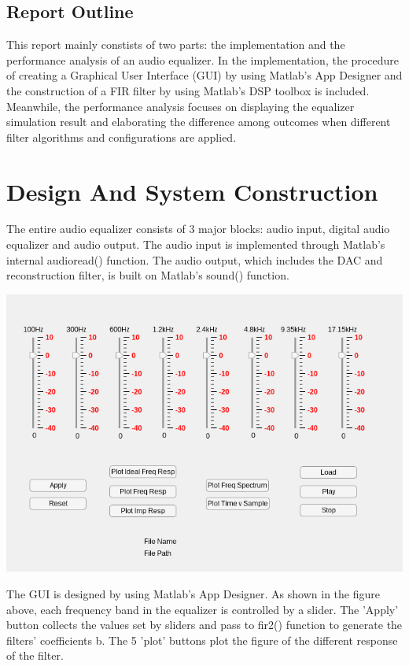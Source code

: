 \documentclass[titlepage]{article}
\begin{document}
\subsection{Report Outline}
\label{sec:orgadad803}
This report mainly constists of two parts: the implementation and the
performance analysis of an audio equalizer. In the implementation, the
procedure of creating a Graphical User Interface (GUI) by using Matlab's App
Designer and the construction of a FIR filter by using Matlab's DSP toolbox
is included. Meanwhile, the performance analysis focuses on displaying the
equalizer simulation result and elaborating the difference among outcomes
when different filter algorithms and configurations are applied.
\section{Design And System Construction}
\label{sec:org301db9d}
The entire audio equalizer consists of 3 major blocks: audio input, digital
audio equalizer and audio output. The audio input is implemented through
Matlab's internal audioread() function. The audio output, which includes the
DAC and reconstruction filter, is built on Matlab's sound() function.

\begin{center}
\includegraphics[width=.9\linewidth]{layout.png}
\end{center}

The GUI is designed by using Matlab's App Designer. As shown in the figure
above, each frequency band in the equalizer is controlled by a slider. The
'Apply' button collects the values set by sliders and pass to fir2() function
to generate the filters' coefficients b. The 5 'plot' buttons plot the figure
of the different response of the filter.
\end{document}
